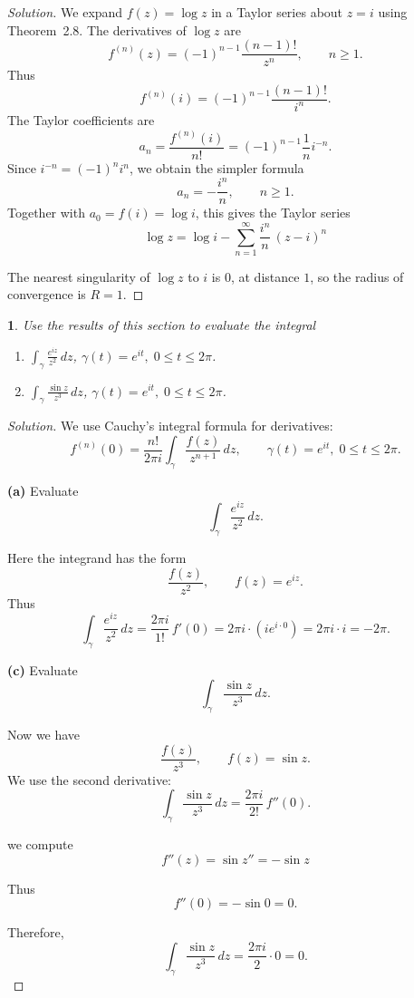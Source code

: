 \documentclass[12pt, a4paper]{report}
\theoremstyle{spaced}
\newtheorem{exercise}{}
\newcommand{\setexercise}[1]{\setcounter{exercise}{#1-1}}
\begin{document}
\begin{proof}[Solution]
	We expand $f(z)=\log z$ in a Taylor series about $z=i$ using Theorem~2.8.
	The derivatives of $\log z$ are
	\[
		f^{(n)}(z)=(-1)^{n-1}\frac{(n-1)!}{z^{n}}, \qquad n\ge 1.
	\]
	Thus
	\[
		f^{(n)}(i)
		= (-1)^{n-1}\frac{(n-1)!}{i^{n}}.
	\]
	The Taylor coefficients are
	\[
		a_n = \frac{f^{(n)}(i)}{n!}
		= (-1)^{n-1}\frac{1}{n}i^{-n}.
	\]
	Since $i^{-n}=(-1)^n i^n$, we obtain the simpler formula
	\[
		a_n = -\frac{i^n}{n}, \qquad n\ge 1.
	\]
	Together with $a_0=f(i)=\log i$, this gives the Taylor series
	\[
		\log z
		= \log i
		- \sum_{n=1}^{\infty} \frac{i^n}{n}\,(z-i)^n
	\]

	\noindent	The nearest singularity of $\log z$ to $i$ is $0$, at distance $1$,
	so the radius of convergence is
	$R=1$.
\end{proof}


\setexercise{7}
\begin{exercise}
	Use the results of this section to evaluate the integral
	\begin{enumerate}[label=(\alph*)]
		\item $\displaystyle  \int_{\gamma} \frac{e^{iz}}{z^{2}}\,dz$,  $\gamma(t)=e^{it},\; 0\le t\le 2\pi$.


		\item[(c)] $\displaystyle \int_{\gamma} \frac{\sin z}{z^{3}}\,dz$,
			$\gamma(t)=e^{it},\; 0\le t\le 2\pi$.
	\end{enumerate}
\end{exercise}

\begin{proof}[Solution]
	We use Cauchy's integral formula for derivatives:
	\[
		f^{(n)}(0)
		= \frac{n!}{2\pi i} \int_{\gamma} \frac{f(z)}{z^{n+1}}\,dz,
		\qquad \gamma(t)=e^{it},\;0\le t\le 2\pi.
	\]

	\textbf{(a)} Evaluate
	\[
		\int_{\gamma} \frac{e^{iz}}{z^{2}}\,dz.
	\]

	Here the integrand has the form
	\[
		\frac{f(z)}{z^{2}}, \qquad f(z)=e^{iz}.
	\]
	Thus
	\[
		\int_{\gamma} \frac{e^{iz}}{z^{2}}\,dz
		= \frac{2\pi i}{1!}\, f'(0)
		= 2\pi i \cdot (i e^{i\cdot 0})
		= 2\pi i \cdot i
		= -2\pi.
	\]

	\bigskip
	\textbf{(c)} Evaluate
	\[
		\int_{\gamma} \frac{\sin z}{z^{3}}\,dz.
	\]

	Now we have
	\[
		\frac{f(z)}{z^{3}}, \qquad f(z)=\sin z.
	\]
	We use the second derivative:
	\[
		\int_{\gamma} \frac{\sin z}{z^{3}}\,dz
		= \frac{2\pi i}{2!}\, f''(0).
	\]

	we compute
	\[
		f''(z)=\sin z'' = -\sin z
	\]

	Thus
	\[
		f''(0)= -\sin 0 = 0.
	\]

	Therefore,
	\[
		\int_{\gamma} \frac{\sin z}{z^{3}}\,dz
		= \frac{2\pi i}{2}\cdot 0
		= 0.
	\]

\end{proof}
\end{document}
